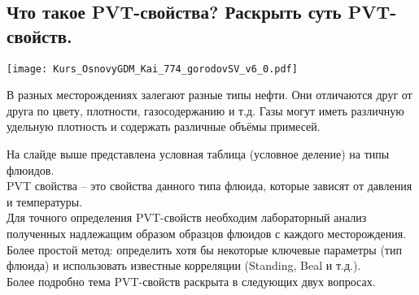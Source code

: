 

\subsection{Что такое PVT-свойства? Раскрыть суть PVT-свойств.}

\texttt{[image: Kurs\_OsnovyGDM\_Kai\_774\_gorodovSV\_v6\_0.pdf]}

В разных месторождениях залегают разные типы нефти.
Они отличаются друг от друга по цвету, плотности, газосодержанию и т.д.
Газы могут иметь различную удельную плотность и содержать различные объёмы примесей.

На слайде выше представлена условная таблица (условное деление) на типы флюидов.
\\

PVT свойства -- это свойства данного типа флюида, которые зависят от давления и температуры. 
\\

Для точного определения PVT-свойств необходим лабораторный анализ полученных надлежащим образом образцов флюидов с каждого месторождения.
\\

Более простой метод: определить хотя бы некоторые ключевые параметры (тип флюида) и использовать известные корреляции (Standing, Beal и т.д.).
\\

Более подробно тема PVT-свойств раскрыта в следующих двух вопросах.

